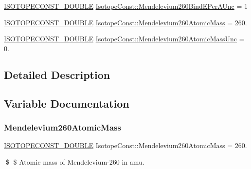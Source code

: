 \begin{DoxyCompactItemize}
\item 
\mbox{\hyperlink{group___isotope_const-_macros_ga8f45a7272ce02c0b4c65c44636ed719a}{I\+S\+O\+T\+O\+P\+E\+C\+O\+N\+S\+T\+\_\+\+D\+O\+U\+B\+LE}} \mbox{\hyperlink{group___isotope_const-_mendelevium-_md260_ga68cc5bb1ad1ab8f514272895c24f716b}{Isotope\+Const\+::\+Mendelevium260\+Bind\+E\+Per\+A\+Unc}} = 1
\item 
\mbox{\hyperlink{group___isotope_const-_macros_ga8f45a7272ce02c0b4c65c44636ed719a}{I\+S\+O\+T\+O\+P\+E\+C\+O\+N\+S\+T\+\_\+\+D\+O\+U\+B\+LE}} \mbox{\hyperlink{group___isotope_const-_mendelevium-_md260_ga314c495db66df6e5670661320bb951d9}{Isotope\+Const\+::\+Mendelevium260\+Atomic\+Mass}} = 260.
\item 
\mbox{\hyperlink{group___isotope_const-_macros_ga8f45a7272ce02c0b4c65c44636ed719a}{I\+S\+O\+T\+O\+P\+E\+C\+O\+N\+S\+T\+\_\+\+D\+O\+U\+B\+LE}} \mbox{\hyperlink{group___isotope_const-_mendelevium-_md260_gab7eba8ec3aa73a7ac6f5af93360583c3}{Isotope\+Const\+::\+Mendelevium260\+Atomic\+Mass\+Unc}} = 0.
\end{DoxyCompactItemize}


\subsection{Detailed Description}


\subsection{Variable Documentation}
\mbox{\label{group___isotope_const-_mendelevium-_md260_ga314c495db66df6e5670661320bb951d9}} 
\subsubsection{\texorpdfstring{Mendelevium260\+Atomic\+Mass}{Mendelevium260AtomicMass}}
{\footnotesize\ttfamily \mbox{\hyperlink{group___isotope_const-_macros_ga8f45a7272ce02c0b4c65c44636ed719a}{I\+S\+O\+T\+O\+P\+E\+C\+O\+N\+S\+T\+\_\+\+D\+O\+U\+B\+LE}} Isotope\+Const\+::\+Mendelevium260\+Atomic\+Mass = 260.}

\$ \$ Atomic mass of Mendelevium-\/260 in amu. \mbox{\label{group___isotope_const-_mendelevium-_md260_gab7eba8ec3aa73a7ac6f5af93360583c3}} 

